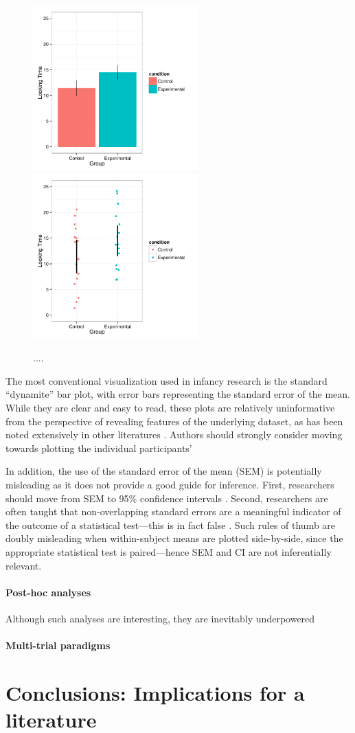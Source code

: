\documentclass[man,noapacite]{apa2}
\begin{document}
\begin{figure}[t]
\centering
  \includegraphics[width=2.5in]{../plots/bars.pdf}
  \includegraphics[width=2.5in]{../plots/scatter.pdf}
	\caption{\label{fig:plots}....}
\end{figure}

The most conventional visualization used in infancy research is the standard ``dynamite'' bar plot, with error bars representing the standard error of the mean. While they are clear and easy to read, these plots are relatively uninformative from the perspective of revealing features of the underlying dataset, as has been noted extensively in other literatures \cite{plosbio}. Authors should strongly consider moving towards plotting the individual participants' 

In addition, the use of the standard error of the mean (SEM) is potentially misleading as it does not provide a good guide for inference. First, researchers should move from SEM to 95\% confidence intervals \cite{cumming2013}. Second, researchers are often taught that non-overlapping standard errors are a meaningful indicator of the outcome of a statistical test---this is in fact false \cite{cumming2006}. Such rules of thumb are doubly misleading when within-subject means are plotted side-by-side, since the appropriate statistical test is paired---hence SEM and CI are not inferentially relevant. 

\paragraph{Post-hoc analyses}

Although such analyses are interesting, they are inevitably underpowered 

\paragraph{Multi-trial paradigms}


\section{Conclusions: Implications for a literature}



\end{document}
